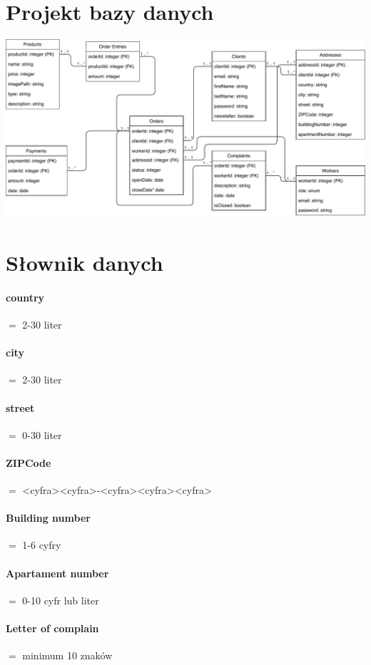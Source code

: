 \documentclass[10pt]{report}
\begin{document}
	\section{Projekt bazy danych}
		\includegraphics[width=500pt]{database.pdf}
		 


\section{Słownik danych}

		\paragraph{country} $=$ 2-30 liter
		\paragraph{city} $=$  2-30 liter
		\paragraph{street} $=$ 0-30 liter
		\paragraph{ZIPCode} $=$ <cyfra><cyfra>-<cyfra><cyfra><cyfra>
		\paragraph{Building number} $=$ 1-6 cyfry
		\paragraph{Apartament number} $=$ 0-10 cyfr lub liter
		\paragraph{Letter of complain} $=$  minimum 10 znaków
\end{document}
